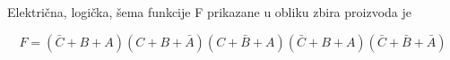 \begin{frame}[label=02-s022]
\gusttekst
Električna, logička, šema funkcije F prikazane u obliku zbira proizvoda je

\centering

\[
F=(\bar C+B+A)(C+B+\bar A)(C+\bar B+A)(\bar C+B+A)(\bar C+\bar B+\bar A)
\]
\end{frame}

